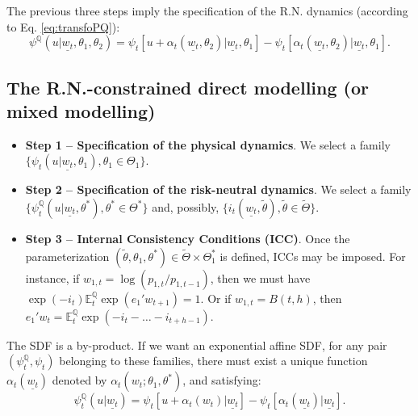 \documentclass[
  12pt,
]{book}
\providecommand{\tightlist}{%
  \setlength{\itemsep}{0pt}\setlength{\parskip}{0pt}}
\theoremstyle{definition}
\theoremstyle{definition}
\theoremstyle{definition}
\theoremstyle{definition}
\theoremstyle{remark}
\begin{document}
The previous three steps imply the specification of the R.N. dynamics (according to Eq. \eqref{eq:transfoPQ}):
\begin{equation*}
\psi^{\mathbb{Q}} (u | \underline{w_t}, \theta_1, \theta_2) =
\psi_t \left[ u + \alpha_t (\underline{w_t}, \theta_2) |
\underline{w_t}, \theta_1 \right] - \psi_t \left[ \alpha_t
(\underline{w_t}, \theta_2) | \underline{w_t}, \theta_1
\right].
\end{equation*}

\hypertarget{the-r.n.-constrained-direct-modelling-or-mixed-modelling}{%
\subsection{The R.N.-constrained direct modelling (or mixed modelling)}\label{the-r.n.-constrained-direct-modelling-or-mixed-modelling}}

\begin{itemize}
\tightlist
\item
  \textbf{Step 1 -- Specification of the physical dynamics}. We select a family \(\{ \psi_t (u | \underline{w_t},\theta_1), \theta_1 \in \Theta_1 \}\).
\item
  \textbf{Step 2 -- Specification of the risk-neutral dynamics}. We select a family \(\{\psi^{\mathbb{Q}}_t (u | \underline{w_t}, \theta^*),\theta^* \in \Theta^* \}\) and, possibly, \(\{i_{t}(\underline{w_t},\tilde{\theta}),\tilde{\theta}\in\tilde{\Theta}\}\).
\item
  \textbf{Step 3 -- Internal Consistency Conditions (ICC)}. Once the parameterization \((\tilde{\theta}, \theta_1, \theta^*) \in \tilde{\Theta} \times \Theta^*_1\) is defined, ICCs may be imposed. For instance, if \(w_{1,t} = \log(p_{1,t}/p_{1,t-1})\), then we must have \(\exp(-i_t)\mathbb{E}^{\mathbb{Q}}_t \exp (e_{1}' w_{t+1}) = 1\). Or if \(w_{1,t} = B(t,h)\), then \(e_{1}' w_{t} = \mathbb{E}_t^{\mathbb{Q}} \exp(-i_t - \dots - i_{t+h-1})\).
\end{itemize}

The SDF is a by-product. If we want an exponential affine SDF, for any pair \((\psi^{\mathbb{Q}}_t, \psi_t)\) belonging to these families, there must exist a unique function \(\alpha_t (\underline{w_t})\) denoted by \(\alpha_t (w_t ; \theta_1, \theta^*)\), and satisfying:
\begin{equation*}
\psi^{\mathbb{Q}}_t (u | \underline{w_t}) = \psi_t \left[ u +
\alpha_t (w_t) | \underline{w_t} \right] - \psi_t \left[
\alpha_t (\underline{w_t}) | \underline{w_t} \right].
\end{equation*}
\end{document}
